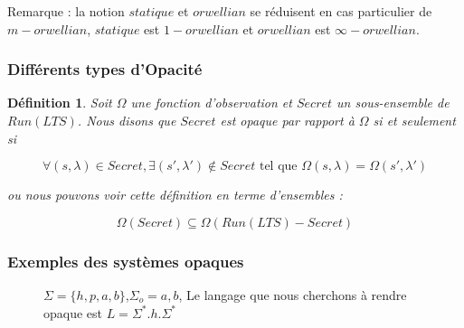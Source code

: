 \documentclass[10pt,a4paper]{article}
\newtheorem{mydef}{D\'efinition}
\begin{document}
	Remarque : la notion $statique$ et $orwellian$ se r\'eduisent en cas particulier de $m-orwellian$, $statique$ est $1-orwellian$ et $orwellian$ est $\infty-orwellian$.

	
\subsubsection{Diff\'erents types d'Opacit\'e}

\begin{mydef}
	Soit $\Omega$ une fonction d'observation et $Secret$ un sous-ensemble de $Run(LTS)$. Nous disons que $Secret$ est opaque par rapport \`a $\Omega$ si et seulement si
	
	$$\forall (s,\lambda) \in Secret, \exists (s',\lambda')\not\in Secret \mbox{ tel que } \Omega(s,\lambda) = \Omega (s',\lambda')$$
	
	ou nous pouvons voir cette d\'efinition en terme d'ensembles :
	
	$$\Omega(Secret)\subseteq \Omega(Run(LTS)-Secret)$$
\end{mydef}

\subsubsection{Exemples des syst\`emes opaques}
		\begin{figure}[H]
                \centering
                \caption{$\Sigma = \{h,p,a,b\}$,$\Sigma_o = {a,b}$, Le langage que nous cherchons \`a rendre opaque est $L = \Sigma^*.h.\Sigma^*$}
		\end{figure}		
		
\end{document}
